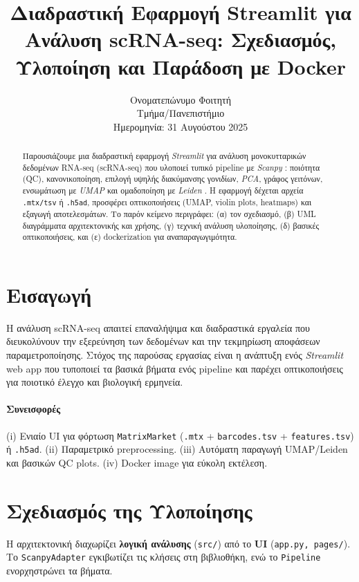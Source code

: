 \documentclass[12pt,a4paper]{article}
\title{\textbf{Διαδραστική Εφαρμογή Streamlit για Ανάλυση scRNA\nobreakdash-seq: Σχεδιασμός, Υλοποίηση και Παράδοση με Docker}}
\author{Ονοματεπώνυμο Φοιτητή \\ Τμήμα/Πανεπιστήμιο \\ Ημερομηνία: 31 Αυγούστου 2025}
\date{}
\begin{document}
\maketitle

\begin{abstract}
Παρουσιάζουμε μια διαδραστική εφαρμογή \textit{Streamlit} για ανάλυση μονοκυτταρικών δεδομένων RNA\nobreakdash-seq (scRNA\nobreakdash-seq) που υλοποιεί τυπικό pipeline με \textit{Scanpy} \cite{wolf2018scanpy}: ποιότητα (QC), κανονικοποίηση, επιλογή υψηλής διακύμανσης γονιδίων, \textit{PCA}, γράφος γειτόνων, ενσωμάτωση με \textit{UMAP} \cite{mcinnes2018umap} και ομαδοποίηση με \textit{Leiden} \cite{traag2019leiden}. Η εφαρμογή δέχεται αρχεία \texttt{.mtx/tsv} ή \texttt{.h5ad}, προσφέρει οπτικοποιήσεις (UMAP, violin plots, heatmaps) και εξαγωγή αποτελεσμάτων. Το παρόν κείμενο περιγράφει: (α) τον σχεδιασμό, (β) UML διαγράμματα αρχιτεκτονικής και χρήσης, (γ) τεχνική ανάλυση υλοποίησης, (δ) βασικές οπτικοποιήσεις, και (ε) dockerization για αναπαραγωγιμότητα.
\end{abstract}

\section{Εισαγωγή}
Η ανάλυση scRNA\nobreakdash-seq απαιτεί επαναλήψιμα και διαδραστικά εργαλεία που διευκολύνουν την εξερεύνηση των δεδομένων και την τεκμηρίωση αποφάσεων παραμετροποίησης. Στόχος της παρούσας εργασίας είναι η ανάπτυξη ενός \textit{Streamlit} web app \cite{streamlit} που τυποποιεί τα βασικά βήματα ενός pipeline \cite{wolf2018scanpy} και παρέχει οπτικοποιήσεις για ποιοτικό έλεγχο και βιολογική ερμηνεία.

\paragraph{Συνεισφορές} (i) Ενιαίο UI για φόρτωση \texttt{MatrixMarket} (\texttt{.mtx} + \texttt{barcodes.tsv} + \texttt{features.tsv}) ή \texttt{.h5ad}. (ii) Παραμετρικό preprocessing. (iii) Αυτόματη παραγωγή UMAP/Leiden και βασικών QC plots. (iv) Docker image για εύκολη εκτέλεση.

\section{Σχεδιασμός της Υλοποίησης}
Η αρχιτεκτονική διαχωρίζει \textbf{λογική ανάλυσης} (\texttt{src/}) από το \textbf{UI} (\texttt{app.py, pages/}). Το \texttt{ScanpyAdapter} εγκιβωτίζει τις κλήσεις στη βιβλιοθήκη, ενώ το \texttt{Pipeline} ενορχηστρώνει τα βήματα.
\end{document}
